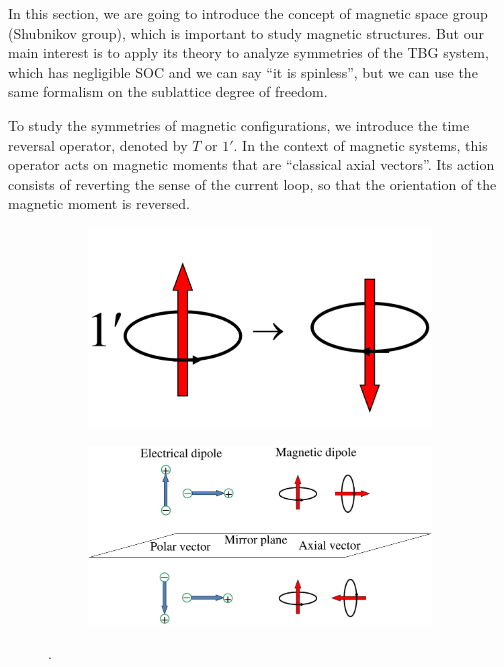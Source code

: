 In this section, we are going to introduce the concept of magnetic space group (Shubnikov group), which is important to study magnetic structures. But our main interest is to apply its theory to analyze symmetries of the TBG system, which has negligible SOC and we can say ``it is spinless'', but we can use the same formalism on the sublattice degree of freedom.

To study the symmetries of magnetic configurations, we introduce the time reversal operator, denoted by $T$ or $1'$. In the context of magnetic systems, this operator acts on magnetic moments that are ``classical axial vectors''. Its action consists of reverting the sense of the current loop, so that the orientation of the magnetic moment is reversed.

\begin{figure}[H]
\centering
\begin{subfigure}{.4\textwidth}
  \centering
  \includegraphics[height=0.4\linewidth]{fig/timerev.png}
  \caption{}
  \label{fig:timerev}
\end{subfigure}%
\begin{subfigure}{.6\textwidth}
  \centering
  \includegraphics[width=\linewidth]{fig/axialvec.png}
  \caption{}
  \label{fig:axialvec}
\end{subfigure}
\caption{.}
\label{fig:geometry}
\end{figure}

